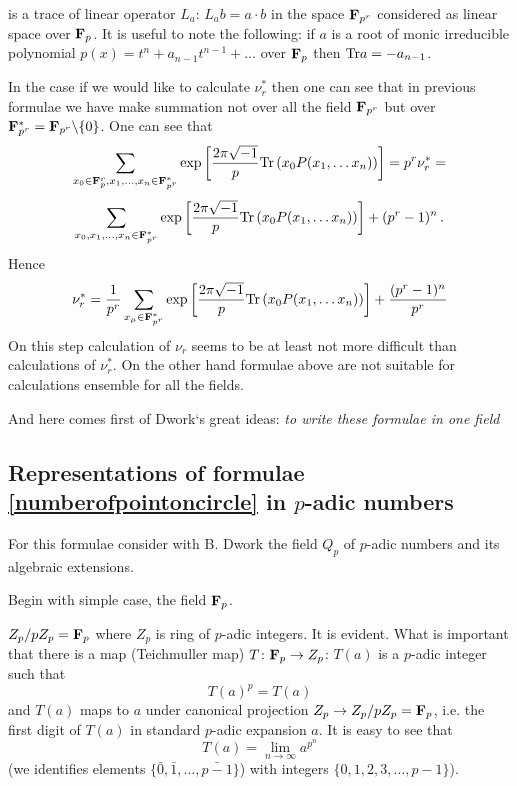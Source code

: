 \documentclass[12pt]{article}
\theoremstyle{theorem}
\numberwithin{equation}{section}
\begin{document}
is a trace of linear operator $L_a\colon \,L_a b=a\cdot b$ in the space ${\bf F}_{p^r}$ considered as linear space
over ${\bf F}_p$.  It is useful to note the following: if $a$ is a root of monic irreducible polynomial
  $p(x)=t^n+a_{n-1}t^{n-1}+\dots$ over ${\bf F}_p$   then ${\rm Tr} a=-a_{n-1}$.


 In the case if we would like to calculate $\nu_r^*$ then one can see that
 in previous formulae we have make summation not over all the field ${\bf F}_{p^r}$
 but over ${\bf F}_{p^r}^*={\bf F}_{p^r}\backslash \{0\}$. One can see that
        $$
    \sum_{x_0\in {\bf F}_p^r,x_1,\dots,x_n\in {\bf F}^*_{p^r}}\exp\left[{2\pi \sqrt{-1}\over p}{\rm Tr}
         \left(x_0P(x_1,\dots x_n)\right)\right]=p^r\nu_r^*=
         $$
                      $$
\sum_{x_0,x_1,\dots,x_n\in {\bf F}^*_{p^r}}\exp\left[{2\pi \sqrt{-1}\over p}{\rm Tr}
         \left(x_0P(x_1,\dots x_n)\right)\right]+(p^r-1)^n\,.
                       $$
Hence
        \begin{equation}\label{numberofpointsforbiggerreduced}
    \nu^*_r={1\over p^r}\sum_{x_\mu\in {\bf F}^*_{p^r}}\exp\left[{2\pi \sqrt{-1}\over p}{\rm Tr}
         \left(x_0P(x_1,\dots x_n)\right)\right]+{(p^r-1)^n\over p^r}
                \end{equation}
On this step calculation of $\nu_r$ seems to be at least not more difficult than calculations of $\nu_r^*$.
On the other hand formulae above are not suitable for calculations ensemble for all the fields.

And here comes first of Dwork`s great ideas: {\it to write these formulae in one field}

\subsection {Representations of formulae \eqref{numberofpointoncircle} in $p$-adic numbers}
 For this formulae consider with B. Dwork the field $Q_p$ of $p$-adic numbers  and its algebraic extensions.

 Begin with simple case, the field ${\bf F}_p$.

  $Z_p/pZ_p={\bf F}_p$ where $Z_p$ is  ring of $p$-adic integers. It is evident.
  What is important that there is a map (Teichmuller map) $T\colon {\bf F}_p\to Z_p$:
  $T(a)$ is a $p$-adic integer such that
  \begin{equation}\label{Teich1}
    T(a)^p=T(a)
\end{equation}
and $T(a)$ maps to $a$ under canonical projection $Z_p\to Z_p/pZ_p={\bf F}_p$, i.e. the first digit of $T(a)$ in standard
 $p$-adic expansion $a$. It is easy to see that
              $$
           T(a)=\lim_{n\to \infty}a^{p^n}
              $$
   (we identifies elements $\{\bar 0,\bar 1,\dots,\bar{p-1}\}$) with integers $\{0,1,2,3,\dots,p-1\}$).
\end{document}
